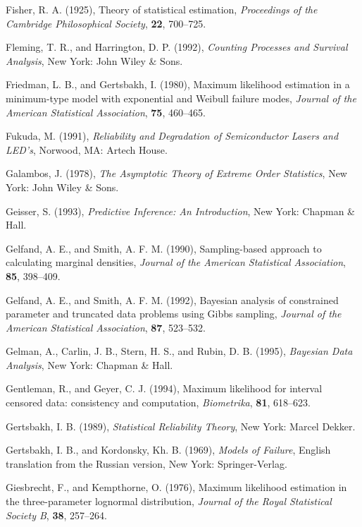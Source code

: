 \begin{thebibliography}{999}
Fisher, R. A. (1925), Theory of statistical estimation, {\em
Proceedings of the Cambridge Philosophical Society}, {\bf 22}, 700--725.

Fleming, T. R., and Harrington, D. P. (1992), {\em Counting Processes
and Survival Analysis}, New York: John Wiley \& Sons.

Friedman, L. B., and Gertsbakh, I. (1980), Maximum likelihood
estimation in a minimum-type model with exponential and Weibull
failure modes, {\em Journal of the American Statistical Association},
{\bf 75}, 460--465.

Fukuda, M. (1991), {\em Reliability and Degradation of Semiconductor
Lasers and LED's}, Norwood, MA: Artech House.

Galambos, J. (1978), {\em The Asymptotic Theory of Extreme Order
Statistics}, New York: John Wiley \& Sons.

Geisser, S. (1993), {\em Predictive Inference: An Introduction}, New
York: Chapman \& Hall.

Gelfand, A. E., and Smith, A. F. M. (1990), Sampling-based approach to
calculating marginal densities, {\em Journal of the American
Statistical Association}, {\bf 85}, 398--409.

Gelfand, A. E., and Smith, A. F. M. (1992), Bayesian analysis of
constrained parameter and truncated data problems using Gibbs
sampling, {\em Journal of the American Statistical Association}, {\bf 87},
523--532.

Gelman, A., Carlin, J. B., Stern, H. S., and Rubin, D. B. (1995),
{\em Bayesian Data Analysis},
New York: Chapman \& Hall.

Gentleman, R., and Geyer, C. J. (1994), Maximum likelihood for
interval censored data: consistency and computation, {\em Biometrika},
{\bf 81}, 618--623.

Gertsbakh, I. B. (1989), {\em Statistical Reliability Theory}, New
York: Marcel Dekker.

Gertsbakh, I. B., and Kordonsky, Kh. B. (1969), {\em Models of
Failure}, English translation from the Russian version, New York:
Springer-Verlag.

Giesbrecht, F., and Kempthorne, O. (1976), Maximum likelihood
estimation in the three-parameter lognormal distribution,  {\em
Journal of the Royal Statistical Society B}, {\bf 38}, 257--264.


\end{thebibliography}
